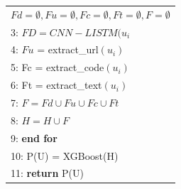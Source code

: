 \documentclass{ieeeaccess}
\begin{document}
\begin{table}[htp]
\begin{tabular}{l}
   \hspace{12pt} $F d=\emptyset, F u=\emptyset, F c=\emptyset, F t=\emptyset, F=\emptyset$
                            \\
3: \hspace{4pt} $FD = CNN-LISTM(u_{i}$                                                                                                                                                                                                                \\
4: \hspace{4pt} $Fu$ = extract\_url$(u_{i})$                                                                                                                                                                                                                                               \\
5: \hspace{4pt} Fc = extract\_code$(u_{i})$                                                                                                                                                                                                                                                              \\
6: \hspace{4pt} Ft = extract\_text$(u_{i})$                                                                                                                                                                                                                                                                \\
7: \hspace{4pt} $F = Fd \cup Fu \cup Fc \cup Ft$                                                                                                                                                                                                                                                \\
8: \hspace{4pt} $H = H \cup F$                                                                                                                                                                                        \\
9: \textbf{end for}                                                                                                                                                                                                                                         \\
10: P(U) = XGBoost(H)  
                                       \\

11: \textbf{return} P(U)

\\ \hline

\end{tabular}
\end{table}
\vspace{4pt}
\end{document}
